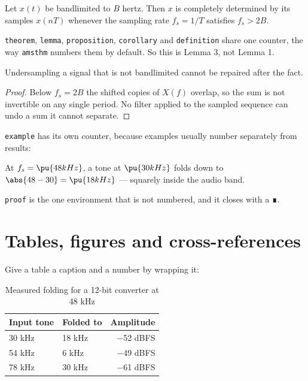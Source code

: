\begin{theorem}
\label{thm-sampling}
Let $x(t)$ be bandlimited to $B$ hertz. Then $x$ is completely determined by its samples $x(nT)$ whenever the sampling rate $f_s = 1/T$ satisfies $f_s > 2B$.
\end{theorem}

\begin{lemma}
\texttt{theorem}, \texttt{lemma}, \texttt{proposition}, \texttt{corollary} and \texttt{definition} share one counter, the way \texttt{amsthm} numbers them by default. So this is Lemma 3, not Lemma 1.
\end{lemma}

\begin{corollary}
Undersampling a signal that is not bandlimited cannot be repaired after the fact.
\end{corollary}

\begin{proof}
Below $f_s = 2B$ the shifted copies of $X(f)$ overlap, so the sum is not invertible on any single period. No filter applied to the sampled sequence can undo a sum it cannot separate.
\end{proof}

\texttt{example} has its own counter, because examples usually number separately from results:

\begin{example}
At $f_s = \pu{48 kHz}$, a tone at $\pu{30 kHz}$ folds down to $\abs{48 - 30} = \pu{18 kHz}$ — squarely inside the audio band.
\end{example}

\texttt{proof} is the one environment that is not numbered, and it closes with a ∎.

\section{Tables, figures and cross-references}

Give a table a caption and a number by wrapping it:

\begin{table}
\caption{Measured folding for a 12-bit converter at 48 kHz}
\label{tbl-folding}
\begin{tabular}{llr}
\hline
Input tone & Folded to & Amplitude \\
\hline
30 kHz & 18 kHz & −52 dBFS \\
54 kHz & 6 kHz & −49 dBFS \\
78 kHz & 30 kHz & −61 dBFS \\
\hline
\end{tabular}
\end{table}

